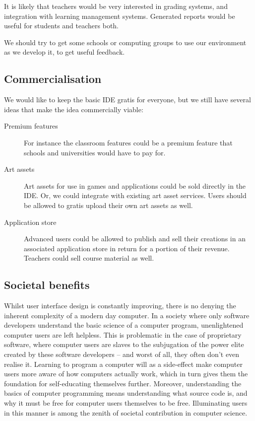 It is likely that teachers would be very interested in grading systems, and 
integration with learning management systems. Generated reports would be 
useful for students and teachers both.

We should try to get some schools or computing groups to use our environment 
as we develop it, to get useful feedback.

\subsection{Commercialisation}

We would like to keep the basic IDE gratis for everyone, but we still have
several ideas that make the idea commercially viable:

\begin{description}
  \item[Premium features]
    For instance the classroom features could be a premium feature that schools
    and universities would have to pay for.
  \item[Art assets]
    Art assets for use in games and applications could be sold directly in the
    IDE. Or, we could integrate with existing art asset services. Users should 
    be allowed to gratis upload their own art assets as well.
  \item[Application store]
    Advanced users could be allowed to publish and sell their creations in an 
    associated application store in return for a portion of their revenue. 
    Teachers could sell course material as well.
\end{description}

\subsection{Societal benefits}
Whilst user interface design is constantly improving, there is no denying the 
inherent complexity of a modern day computer. In a society where only software 
developers understand the basic science of a computer program, unenlightened 
computer users are left helpless. This is problematic in the case of 
proprietary software, where computer users are slaves to the subjugation of 
the power elite created by these software developers -- and worst of all, they 
often don't even realise it. Learning to program a computer will as a 
side-effect make computer users more aware of how computers actually work, 
which in turn gives them the foundation for self-educating themselves further. 
Moreover, understanding the basics of computer programming means understanding 
what source code is, and why it must be free for computer users themselves to 
be free. Illuminating users in this manner is among the zenith of societal 
contribution in computer science.

